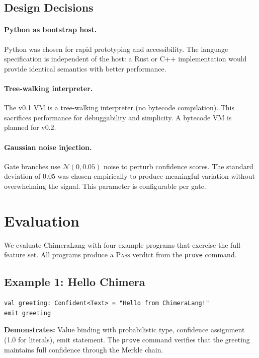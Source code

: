 \documentclass[11pt,a4paper]{article}
\begin{document}
\subsection{Design Decisions}

\paragraph{Python as bootstrap host.}
Python was chosen for rapid prototyping and accessibility. The language
specification is independent of the host: a Rust or C++ implementation
would provide identical semantics with better performance.

\paragraph{Tree-walking interpreter.}
The v0.1 VM is a tree-walking interpreter (no bytecode compilation).
This sacrifices performance for debuggability and simplicity. A bytecode
VM is planned for v0.2.

\paragraph{Gaussian noise injection.}
Gate branches use $\mathcal{N}(0, 0.05)$ noise to perturb confidence
scores. The standard deviation of 0.05 was chosen empirically to produce
meaningful variation without overwhelming the signal. This parameter is
configurable per gate.

\section{Evaluation}
\label{sec:evaluation}

We evaluate ChimeraLang with four example programs that exercise the full
feature set. All programs produce a \textsc{Pass} verdict from the
\texttt{prove} command.

\subsection{Example 1: Hello Chimera}

\begin{lstlisting}[caption={Minimal ChimeraLang program.}]
val greeting: Confident<Text> = "Hello from ChimeraLang!"
emit greeting
\end{lstlisting}

\textbf{Demonstrates:} Value binding with probabilistic type, confidence
assignment (1.0 for literals), emit statement. The \texttt{prove} command
verifies that the greeting maintains full confidence through the Merkle chain.
\end{document}
